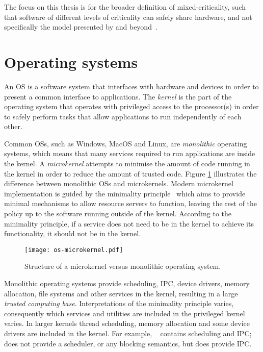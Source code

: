 The focus on this thesis is for the broader definition of mixed-criticality, such that software of
different levels of criticality can safely share hardware, and not specifically the model
presented by \citet{Vestal_07} and beyond~\citep{Burns_Davis_17}.

\section{Operating systems}
\label{sec:background-operating-systems}

An \gls{OS} is a software system that interfaces with hardware and devices in order to present a
common interface to applications.  The \emph{kernel} is the part of the operating system that
operates with privileged access to the processor(s) in order to safely perform tasks that allow
applications to run independently of each other.

Common \glspl{OS}, such as Windows, MacOS and Linux, are \emph{monolithic} operating systems,
which means that many services required to run applications are inside the kernel.  A \emph{microkernel}
attempts to minimise the amount of code running in the kernel in order to reduce the amount of
trusted code.  Figure \ref{fig:os-microkernel} illustrates the difference between monolithic
\glspl{OS} and microkernels.  Modern microkernel implementation is guided by the minimality
principle~\citep{Liedtke_95} which aims to provide minimal mechanisms to allow resource servers to
function, leaving the rest of the policy up to the software running outside of the kernel. According
to the minimality principle, if a service does not need to be in the kernel to achieve its
functionality, it should not be in the kernel.

\begin{figure}[tb]
	\begin{center}
		\leavevmode
		\texttt{[image: os-microkernel.pdf]}
		\caption{Structure of a microkernel versus monolithic operating system.}
		\label{fig:os-microkernel}
	\end{center}
\end{figure}

Monolithic operating systems provide scheduling, \gls{IPC}, device drivers, memory allocation, file
systems and other services in the kernel, resulting in a large \emph{trusted computing base}.
Interpretations of the minimality principle varies, 
consequently which services and utilities are included in the privileged kernel varies. In
larger kernels thread scheduling, memory allocation and some device drivers are included in the kernel.
For example, \selfour~\citep{Klein_EHACDEEKNSTW_09} contains scheduling and \gls{IPC}; 
\composite~\citep{Parmer:phd} does not provide a scheduler, or any blocking semantics, but does
provide \gls{IPC}. 

